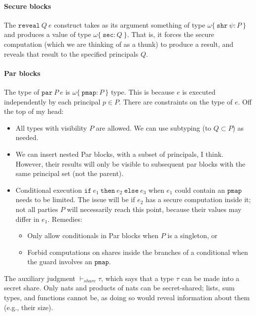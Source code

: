 \documentclass[10pt]{article}
\newcommand{\kw}[1]{\ensuremath{\mathtt{#1}}}
\newcommand{\ssec}{\ensuremath{\mathtt{sec}}}
\newcommand{\isec}{\ensuremath{\mathtt{pmap}}}
\newcommand{\sshare}[1]{\ensuremath{\mathtt{shr}~{#1}}}
\newcommand{\sectyp}[3]{\ensuremath{{#1} \{~{#2}:{#3}~\}}}
\newcommand{\epar}[2]{\ensuremath{\kw{par}~{#1}~{#2}}}
\newcommand{\ereveal}[2]{\ensuremath{\kw{reveal}~{#1}~{#2}}}
\newcommand{\econd}[3]{\ensuremath{\kw{if}~{#1}~\kw{then}~{#2}~\kw{else}~{#3}}}
\newcommand{\canshare}[1]{\ensuremath{\vdash_{\mathit{share}} {#1}}}
\begin{document}
\paragraph*{Secure blocks}

The $\ereveal{Q}{e}$ construct takes as its argument something of type
$\sectyp{\omega}{\sshare{\psi}}{P}$ and produces a value of type
$\sectyp{\omega}{\ssec}{Q}$. That is, it forces the secure computation
(which we are thinking of as a thunk) to produce a result, and reveals
that result to the specified principals $Q$.

\paragraph*{Par blocks}

The type of $\epar{P}{e} $ is $\sectyp{\omega}{\isec}{P}$
type. This is because $e$ is executed independently by each principal
$p \in P$. There are constraints on the type of $e$. Off the top of my
head:
\begin{itemize}
\item All types with visibility $P$ are allowed. We can use subtyping
  (to $Q \subset P$) as needed.
  \item We can insert nested Par blocks, with a subset of principals,
    I think. However, their results will only be visible to subsequent
    par blocks with the same principal set (not the parent).
  \item Conditional execution $\econd{e_1}{e_2}{e_3}$ when $e_1$ could
    contain an $\isec$ needs to be limited. The issue will be if $e_2$
    has a secure computation inside it; not all parties $P$ will
    necessarily reach this point, because their values may differ in
    $e_1$. Remedies:
    \begin{itemize}
      \item Only allow conditionals in Par blocks when $P$ is a singleton, or
      \item Forbid computations on shares inside the branches of a
        conditional when the guard involves an \isec.
      \end{itemize}
\end{itemize}

The auxiliary judgment $\canshare{\tau}$, which says that a type
$\tau$ can be made into a secret share. Only nats and products of nats
can be secret-shared; lists, sum types, and functions cannot be, as
doing so would reveal information about them (e.g., their size).
\end{document}
